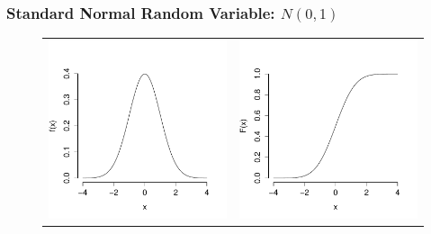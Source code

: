 \documentclass[handout]{beamer}
\begin{document}
\begin{frame}
\frametitle{Standard Normal Random Variable: $N(0,1)$}

\begin{figure}[h]
  \centering
  \begin{tabular}{cc}
  \includegraphics[scale = 0.3]{./images/std_normal_PDF}
  &  
  \includegraphics[scale = 0.3]{./images/std_normal_CDF}

\end{tabular}
\end{figure}
\end{frame}
\end{document}
